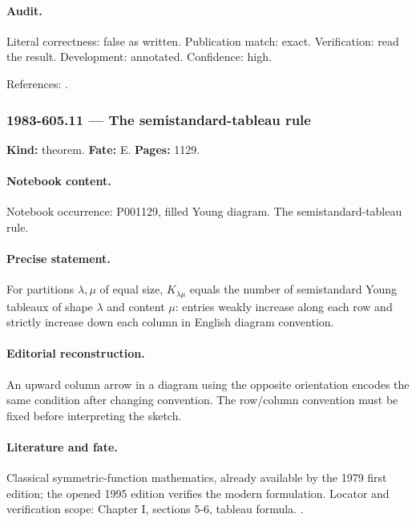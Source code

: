 \paragraph{Audit.} Literal correctness: false as written. Publication match: exact. Verification: read the result. Development: annotated. Confidence: high.

\noindent References: \citep{macdonald1995symmetric}.\par

\subsubsection{1983-605.11 --- The semistandard-tableau rule}

\label{item:1983-605.11}

\noindent\textbf{Kind:} theorem. \textbf{Fate:} E. \textbf{Pages:} 1129.\par

\paragraph{Notebook content.} Notebook occurrence: P001129, filled Young diagram. The semistandard-tableau rule.

\paragraph{Precise statement.} For partitions \(\lambda,\mu\) of equal size, \(K_{\lambda\mu}\) equals the number of semistandard Young tableaux of shape \(\lambda\) and content \(\mu\): entries weakly increase along each row and strictly increase down each column in English diagram convention.

\paragraph{Editorial reconstruction.} An upward column arrow in a diagram using the opposite orientation encodes the same condition after changing convention. The row/column convention must be fixed before interpreting the sketch.

\paragraph{Literature and fate.} Classical symmetric-function mathematics, already available by the 1979 first edition; the opened 1995 edition verifies the modern formulation. Locator and verification scope: Chapter I, sections 5-6, tableau formula. \cite{macdonald1995symmetric}.

